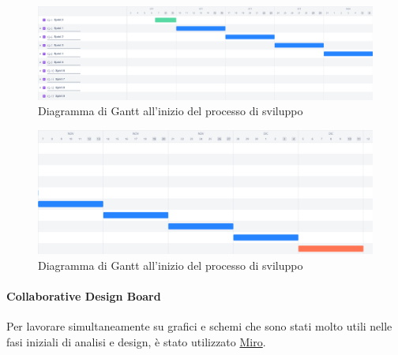         \begin{figure}[H]
            \centering
            \includegraphics[width=\textwidth]{Images/Jira_sprintInizio1png.png}
            \caption{Diagramma di Gantt all'inizio del processo di sviluppo}
            \label{fig:jira-start1}
        \end{figure}

        \begin{figure}[H]
            \centering
            \includegraphics[width=\textwidth]{Images/Jira_sprintInizio2png.png}
            \caption{Diagramma di Gantt all'inizio del processo di sviluppo}
            \label{fig:jira-start2}
        \end{figure}
    
    \paragraph{Collaborative Design Board}
    Per lavorare simultaneamente su grafici e schemi che sono stati molto utili nelle fasi iniziali di analisi e design, è stato utilizzato \href{https://miro.com}{Miro}.

